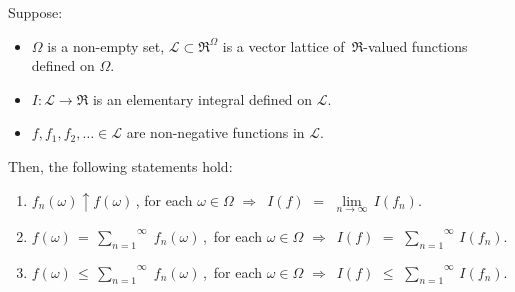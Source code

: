 \clearpage
\begin{lemma}
\mbox{}\vskip 0.1cm
\noindent
Suppose:
\begin{itemize}
\item
	$\Omega$ is a non-empty set,
	$\mathcal{L} \subset \Re^{\Omega}$ is a vector lattice of \,$\Re$-valued functions defined on $\Omega$.
\item
	$I : \mathcal{L} \longrightarrow \Re$ is an elementary integral defined on $\mathcal{L}$.
\item
	$f, f_{1}, f_{2}, \ldots \in \mathcal{L}$ are non-negative functions in $\mathcal{L}$.
\end{itemize}
Then, the following statements hold:
\begin{enumerate}
\item
	$f_{n}(\omega) \uparrow f(\omega)$\,, for each $\omega\in\Omega$
	\;\;$\Longrightarrow$\;\,
	$I(f)$ $=$ $\underset{n\rightarrow\infty}{\lim}\,I(f_{n})$.
\item
	$f(\omega) \,=\, \overset{\infty}{\underset{n=1}{\sum}}\;f_{n}(\omega)$\,,\,
	for each $\omega\in\Omega$
	\;\;$\Longrightarrow$\;\,
	$I(f)$ $=$ $\overset{\infty}{\underset{n=1}{\sum}}\,I(f_{n})$.
\item
	$f(\omega) \,\leq\, \overset{\infty}{\underset{n=1}{\sum}}\;f_{n}(\omega)$\,,\,
	for each $\omega\in\Omega$
	\;\;$\Longrightarrow$\;\,
	$I(f)$ $\leq$ $\overset{\infty}{\underset{n=1}{\sum}}\,I(f_{n})$.
\end{enumerate}
\end{lemma}
\proof
